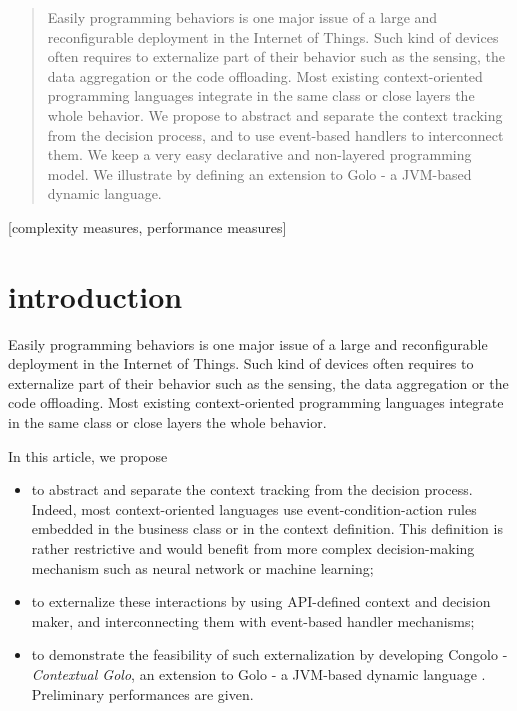\documentclass{sig-alternate}
\begin{document}
\maketitle
\begin{abstract}
Easily programming behaviors is one major issue of a large and reconfigurable deployment in the Internet of Things. Such kind of devices often requires to externalize part of their behavior such as the sensing, the data aggregation or the code offloading. Most existing context-oriented programming languages integrate in the same class or close layers the whole behavior. We propose to abstract and separate the context tracking from the decision process, and to use event-based handlers to interconnect them. We keep a very easy declarative and non-layered programming model. We illustrate by defining an extension to Golo - a JVM-based dynamic language.
\end{abstract}

[complexity measures, performance measures]



\section{introduction}
Easily programming behaviors is one major issue of a large and reconfigurable deployment in the Internet of Things. Such kind of devices often requires to externalize part of their behavior such as the sensing, the data aggregation or the code offloading. Most existing context-oriented programming languages integrate in the same class or close layers the whole behavior. 

In this article, we propose 
\begin{itemize}
\item to abstract and separate the context tracking from the decision process. Indeed, most context-oriented languages use event-condition-action rules embedded in the business class or in the context definition. This definition is rather restrictive and would benefit from more complex decision-making mechanism such as neural network or machine learning;
\item to externalize these interactions by using API-defined context and decision maker, and interconnecting them with event-based handler mechanisms;
\item to demonstrate the feasibility of such externalization by developing Congolo - \emph{Contextual Golo}, an extension to Golo - a JVM-based dynamic language \cite{ponge_golo_2013}. Preliminary performances are given.
\end{itemize}
\end{document}
